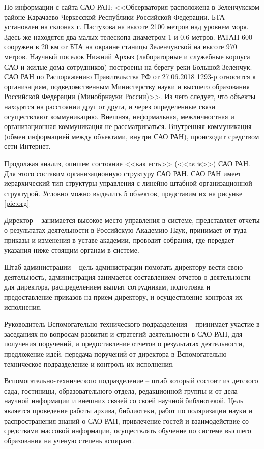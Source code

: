 По информации с сайта САО РАН: <<Обсерватория расположена в Зеленчукском районе Карачаево-Черкесской Республики Российской Федерации. БТА установлен на склонах г. Пастухова на высоте 2100 метров над уровнем моря. Здесь же находятся два малых телескопа диаметром 1 и 0.6 метров. РАТАН-600 сооружен в 20 км от БТА на окраине станицы Зеленчукской на высоте 970 метров. Научный поселок Нижний Архыз (лабораторные и служебные корпуса САО и жилые дома сотрудников) построены на берегу реки Большой Зеленчук. САО РАН по Распоряжению Правительства РФ от 27.06.2018 1293-р относится к организациям, подведомственным Министерству науки и высшего образования Российской Федерации (Минобрнауки России)>>\cite{Korn}. Из чего следует, что объекты находятся на расстоянии друг от друга, и через определенные связи осуществляют коммуникацию. Внешняя, неформальная, межличностная и организационная коммуникация не рассматриваться. Внутренняя коммуникация (обмен информацией между объектами, внутри САО РАН), происходит средством сети Интернет. 

 

Продолжая анализ, опишем состояние <<как есть>> (<<as is>>) САО РАН. Для этого составим организационную структуру САО РАН. САО РАН имеет иерархический тип структуры управления с линейно-штабной организационной структурой. Условно можно выделить 5 объектов, представим их  на рисунке \ref{pic:org}

Директор -- занимается высокое место управления в системе, представляет отчеты о результатах деятельности в Российскую Академию Наук, принимает от туда приказы и изменения в уставе академии, проводит собрания, где передает указания ниже стоящим органам в системе.
  
Штаб администрации -- цель администрации помогать директору вести свою деятельность, администрация занимается составлением отчетов о деятельности для директора, распределением выплат сотрудникам, подготовка и предоставление приказов на прием директору, и осуществление контроля их исполнения.

Руководитель Вспомогательно-технического подразделения -- принимает участие в заседаниях по вопросам развития и стратегий деятельности в САО РАН, для получения поручений, и предоставление отчетов о результатах деятельности, предложение идей, передача поручений от директора в Вспомогательно-техническое подразделение и контроль их исполнения. 

Вспомогательно-технического подразделение -- штаб который состоит из детского сада, гостиницы, образовательного отдела, редакционной группы и от дела научной информации и внешних связей со своей научной библиотекой. Цель является проведение работы архива, библиотеки, работ по поляризации науки и распространения знаний о САО РАН, привлечение гостей и взаимодействие со средствами массовой информации, осуществлять обучение по системе высшего образования на ученую степень аспирант. 

